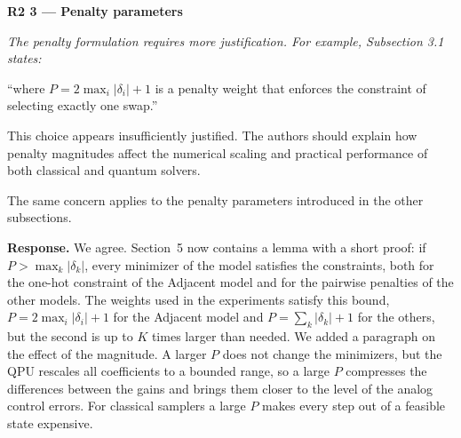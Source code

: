 \documentclass[12pt]{article}
\newenvironment{rc}[1]{\par\medskip\noindent\textbf{#1}\par\nopagebreak\noindent\itshape\renewcommand{\emph}[1]{\textbf{##1}}\ignorespaces}{\par}
\newcommand{\answer}[1]{\par\smallskip\noindent\textbf{Response.} #1\par}
\begin{document}
\begin{rc}{R2 3 --- Penalty parameters}
The penalty formulation requires more justification. For example, Subsection 3.1 states:

``where $P=2\max_i|\delta_i|+1$ is a penalty weight that enforces the constraint of selecting exactly one swap.''

This choice appears insufficiently justified. The authors should explain how penalty magnitudes affect the numerical scaling and practical performance of both classical and quantum solvers.

The same concern applies to the penalty parameters introduced in the other subsections.
\end{rc}
\answer{We agree. Section~5 now contains a lemma with a short proof: if $P>\max_k|\delta_k|$, every minimizer of the model satisfies the constraints, both for the one-hot constraint of the Adjacent model and for the pairwise penalties of the other models. The weights used in the experiments satisfy this bound, $P=2\max_i|\delta_i|+1$ for the Adjacent model and $P=\sum_k|\delta_k|+1$ for the others, but the second is up to $K$ times larger than needed. We added a paragraph on the effect of the magnitude. A larger $P$ does not change the minimizers, but the QPU rescales all coefficients to a bounded range, so a large $P$ compresses the differences between the gains and brings them closer to the level of the analog control errors. For classical samplers a large $P$ makes every step out of a feasible state expensive.}
\end{document}
